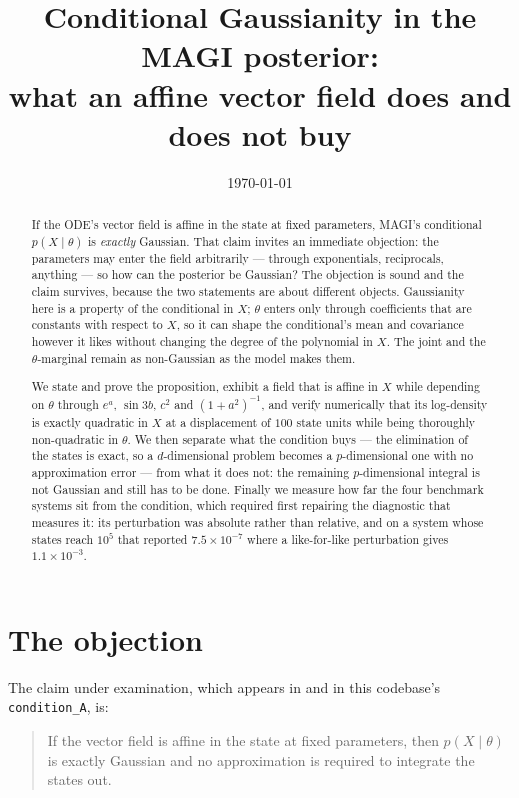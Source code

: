 \documentclass[11pt]{article}
\title{\bfseries Conditional Gaussianity in the MAGI posterior:\\[2pt]
what an affine vector field does and does not buy}
\author{}
\date{\today}
\newcommand{\code}[1]{\texttt{\small #1}}
\theoremstyle{plain}
\theoremstyle{definition}
\theoremstyle{remark}
\begin{document}
\maketitle

\begin{abstract}
\noindent
If the ODE's vector field is affine in the state at fixed parameters, MAGI's conditional
$p(X \mid \theta)$ is \emph{exactly} Gaussian. That claim invites an immediate objection: the
parameters may enter the field arbitrarily --- through exponentials, reciprocals, anything --- so
how can the posterior be Gaussian? The objection is sound and the claim survives, because the two
statements are about different objects. Gaussianity here is a property of the conditional in $X$;
$\theta$ enters only through coefficients that are constants with respect to $X$, so it can shape
the conditional's mean and covariance however it likes without changing the degree of the
polynomial in $X$. The joint and the $\theta$-marginal remain as non-Gaussian as the model makes
them.

We state and prove the proposition, exhibit a field that is affine in $X$ while depending on
$\theta$ through $e^{a}$, $\sin 3b$, $c^{2}$ and $(1+a^{2})^{-1}$, and verify numerically that its
log-density is exactly quadratic in $X$ at a displacement of $100$ state units while being
thoroughly non-quadratic in $\theta$. We then separate what the condition buys --- the elimination
of the states is exact, so a $d$-dimensional problem becomes a $p$-dimensional one with no
approximation error --- from what it does not: the remaining $p$-dimensional integral is not
Gaussian and still has to be done. Finally we measure how far the four benchmark systems sit from
the condition, which required first repairing the diagnostic that measures it: its perturbation was
absolute rather than relative, and on a system whose states reach $10^{5}$ that reported
$7.5\times10^{-7}$ where a like-for-like perturbation gives $1.1\times10^{-3}$.
\end{abstract}

\section{The objection}

The claim under examination, which appears in \cite{companion1} and in this codebase's
\code{condition\_A}, is:

\begin{quote}
If the vector field is affine in the state at fixed parameters, then $p(X \mid \theta)$ is exactly
Gaussian and no approximation is required to integrate the states out.
\end{quote}
\end{document}
